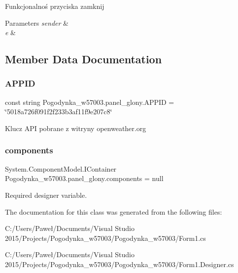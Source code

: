 Funkcjonalnoś przyciska zamknij 


\begin{DoxyParams}{Parameters}
{\em sender} & \\
\hline
{\em e} & \\
\hline
\end{DoxyParams}


\subsection{Member Data Documentation}
\mbox{\label{class_pogodynka__w57003_1_1panel__glony_a66dfd1c1fa2fc6daa20d17f8bf64c7a4}} 
\subsubsection{\texorpdfstring{A\+P\+P\+ID}{APPID}}
{\footnotesize\ttfamily const string Pogodynka\+\_\+w57003.\+panel\+\_\+glony.\+A\+P\+P\+ID = \char`\"{}5018a726f091f2f233b3af11f9e207c8\char`\"{}\hspace{0.3cm}{\ttfamily [private]}}



Klucz A\+PI pobrane z witryny openweather.\+org 

\mbox{\label{class_pogodynka__w57003_1_1panel__glony_aa887be71e8f5b4267c82225f05b88ae2}} 
\subsubsection{\texorpdfstring{components}{components}}
{\footnotesize\ttfamily System.\+Component\+Model.\+I\+Container Pogodynka\+\_\+w57003.\+panel\+\_\+glony.\+components = null\hspace{0.3cm}{\ttfamily [private]}}



Required designer variable. 



The documentation for this class was generated from the following files\+:\begin{DoxyCompactItemize}
\item 
C\+:/\+Users/\+Paweł/\+Documents/\+Visual Studio 2015/\+Projects/\+Pogodynka\+\_\+w57003/\+Pogodynka\+\_\+w57003/Form1.\+cs\item 
C\+:/\+Users/\+Paweł/\+Documents/\+Visual Studio 2015/\+Projects/\+Pogodynka\+\_\+w57003/\+Pogodynka\+\_\+w57003/Form1.\+Designer.\+cs\end{DoxyCompactItemize}
